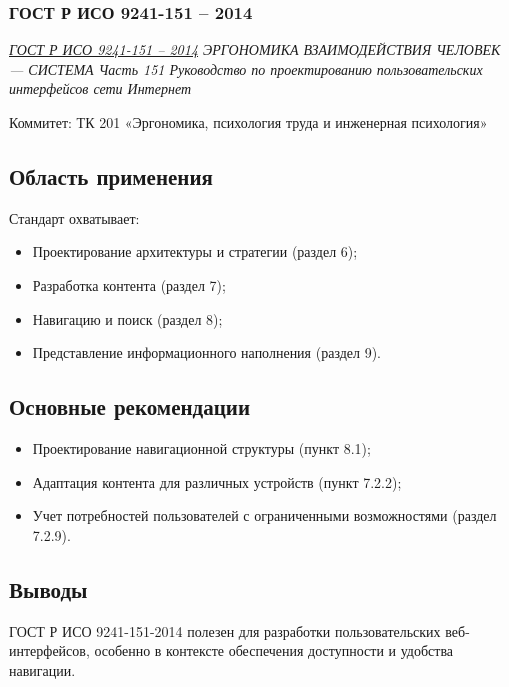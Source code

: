 \subsubsection{ГОСТ Р ИСО 9241-151 -- 2014}

\emph{\href{https://meganorm.ru/Data2/1/4293768/4293768927.pdf}{ГОСТ Р ИСО 9241-151 -- 2014}
ЭРГОНОМИКА ВЗАИМОДЕЙСТВИЯ
ЧЕЛОВЕК — СИСТЕМА Часть 151
Руководство по проектированию пользовательских
интерфейсов сети Интернет
}
\par
Коммитет:  ТК 201 «Эргономика, психология труда и инженерная психология»
\subsection*{Область применения}
Стандарт охватывает:
\begin{itemize}
    \item Проектирование архитектуры и стратегии (раздел 6);
    \item Разработка контента (раздел 7);
    \item Навигацию и поиск (раздел 8);
    \item Представление информационного наполнения (раздел 9).
\end{itemize}

\subsection*{Основные рекомендации}
\begin{itemize}
    \item Проектирование навигационной структуры (пункт 8.1);
    \item Адаптация контента для различных устройств (пункт 7.2.2);
    \item Учет потребностей пользователей с ограниченными возможностями (раздел 7.2.9).
\end{itemize}

\subsection*{Выводы}
ГОСТ Р ИСО 9241-151-2014 полезен для разработки пользовательских веб-интерфейсов, особенно в контексте обеспечения доступности и удобства навигации.
